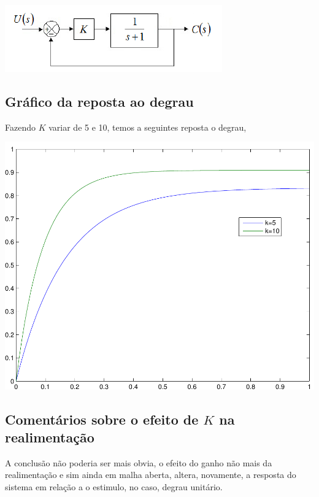 \documentclass[paper=a4, fontsize=11pt]{article}
\begin{document}
\begin{center}
    \includegraphics[scale=0.5]{q6.png}
\end{center}

\subsection{Gráfico da reposta ao degrau}

Fazendo $K$ variar de 5 e 10, temos a seguintes reposta o degrau,

\begin{center}
    \includegraphics[scale=0.5]{q6ia.pdf}
\end{center}

\subsection{Comentários sobre o efeito de $K$ na realimentação}

A conclusão não poderia ser mais obvia, o efeito do ganho não mais da realimentação
e sim ainda em malha aberta, altera, novamente, a resposta do sistema em relação
a o estimulo, no caso, degrau unitário.

\end{document}
